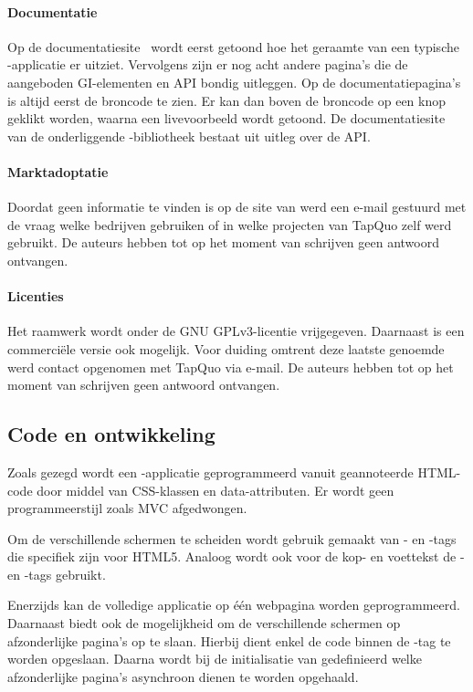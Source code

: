 \paragraph{Documentatie}
Op de documentatiesite~\cite{Lungo2013} wordt eerst getoond hoe het geraamte van een typische \lungo{}-applicatie er uitziet.
Vervolgens zijn er nog acht andere pagina's die de aangeboden GI-elementen en API bondig uitleggen.
Op de documentatiepagina's is altijd eerst de broncode te zien.
Er kan dan boven de broncode op een knop geklikt worden, waarna een livevoorbeeld wordt getoond.
De documentatiesite~\cite{TapQuo2013c} van de onderliggende \js{}-bibliotheek bestaat uit uitleg over de API.

\paragraph{Marktadoptatie}
Doordat geen informatie te vinden is op de site van \lungo{} werd een e-mail gestuurd met de vraag welke bedrijven \lungo{} gebruiken of in welke projecten van TapQuo zelf \lungo{} werd gebruikt.
De auteurs hebben tot op het moment van schrijven geen antwoord ontvangen.

\paragraph{Licenties}
Het raamwerk wordt onder de GNU GPLv3-licentie vrijgegeven.
Daarnaast is een commerciële versie ook mogelijk.
Voor duiding omtrent deze laatste genoemde werd contact opgenomen met TapQuo via e-mail.
De auteurs hebben tot op het moment van schrijven geen antwoord ontvangen.

\subsection{Code en ontwikkeling}
Zoals gezegd wordt een \lungo{}-applicatie geprogrammeerd vanuit geannoteerde HTML-code door middel van CSS-klassen en data-attributen.
Er wordt geen programmeerstijl zoals MVC afgedwongen.

Om de verschillende schermen te scheiden wordt gebruik gemaakt van - en -tags die specifiek zijn voor HTML5.
Analoog wordt ook voor de kop- en voettekst de - en -tags gebruikt.

Enerzijds kan de volledige applicatie op één webpagina worden geprogrammeerd.
Daarnaast biedt \lungo{} ook de mogelijkheid om de verschillende schermen op afzonderlijke pagina's op te slaan.
Hierbij dient enkel de code binnen de -tag te worden opgeslaan.
Daarna wordt bij de initialisatie van \lungo{} gedefinieerd welke afzonderlijke pagina's asynchroon dienen te worden opgehaald.

